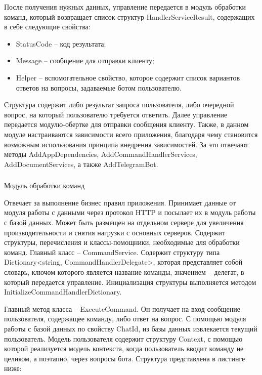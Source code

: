 После получения нужных данных, управление передается в модуль обработки команд, который возвращает список структур \linebreak HandlerServiceResult, содержащих в себе следующие свойства:

\begin{itemize}
	\item StatusCode – код результата;
	\item Message – сообщение для отправки клиенту;
	\item Helper – вспомогательное свойство, которое содержит список
вариантов ответов на вопросы, задаваемые ботом пользователю.
\end{itemize}

Структура содержит либо результат запроса пользователя, либо очередной вопрос, на который пользователю требуется ответить.
Далее управление передается модулю-обертке для отправки сообщения клиенту.
Также, в данном модуле настраиваются зависимости всего приложения, благодаря чему становится возможным использования принципа внедрения зависимостей. За это отвечают методы AddAppDependencies, AddCommandHandler\linebreak Services, AddDocumentServices, а также AddTelegramBot.

\subsubsection{} Модуль обработки команд
\label{sec:design:server:framework}

Отвечает за выполнение бизнес правил приложения. Принимает данные от модуля работы с данными через протокол HTTP и посылает их в модуль работы с базой данных. Может быть размещен на отдельном сервере для увеличения производительности и снятия нагрузки с основных серверов.
Содержит структуры, перечисления и классы-помощники, необходимые для обработки команд.
Главный класс – CommandService. Содержит структуру типа Dictionary<string, CommandHandlerDelegate>, которая представляет собой словарь, ключом которого является название команды, значением – делегат, в который передается управление.
Инициализация структуры выполняется методом InitializeCommandHandlerDictionary.

Главный метод класса – ExecuteCommand. Он получает на вход сообщение пользователя, содержащее команду, либо ответ на вопрос. С помощью модуля работы с базой данных по свойству ChatId, из базы данных извлекается текущий пользователь.
Модель пользователя содержит структуру Context, с помощью которой реализуется модель контекста, когда пользователь вводит команду не целиком, а поэтапно, через вопросы бота. Структура представлена в листинге ниже:

